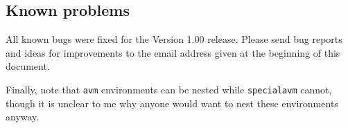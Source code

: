 \subsection{Known problems}

All known bugs were fixed for the Version 1.00 release.  Please send bug
reports and ideas for improvements to the email address given at the
beginning of this document.




Finally, note that \verb+avm+ environments can be nested while
\verb+specialavm+ cannot, though it is unclear to me why anyone would want
to nest these environments anyway.
\begin{examples}


\item \begin{avm}  \end{avm}A  AA  A[

\item \newbox\testing
\setbox\testing=\hbox{\begin{avm} \osort{x}{\[ A \]} \end{avm}}
\leavevmode\box\testing A

\item \begin{avm} 
\[ a & b \\[3ex]
c & d \\[6ex]
e & f \\
g & h \]
\end{avm}

\item \begin{avm}
\< \begin{avm} \[ case & nom\\ gend & fem \] \end{avm}, 
\begin{avm} \[ case & abl\\ gend & fem \] \end{avm} \>
\end{avm}

\item
{\obeyspaces\begin{verbatim}
\begin{avm}
\< \begin{avm} \[ case & nom\\ gend & fem \] \end{avm}, 
\begin{avm} \[ case & abl\\ gend & fem \] \end{avm} \>
\end{avm}
\end{verbatim}}
\end{examples}

